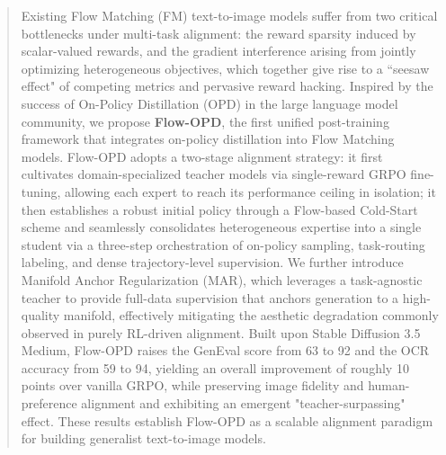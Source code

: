 \begin{abstract}
Existing Flow Matching (FM) text-to-image models suffer from two critical bottlenecks under multi-task alignment: the reward sparsity induced by scalar-valued rewards, and the gradient interference arising from jointly optimizing heterogeneous objectives, which together give rise to a ``seesaw effect" of competing metrics and pervasive reward hacking. Inspired by the success of On-Policy Distillation (OPD) in the large language model community, we propose \textbf{Flow-OPD}, the first unified post-training framework that integrates on-policy distillation into Flow Matching models. Flow-OPD adopts a two-stage alignment strategy: it first cultivates domain-specialized teacher models via single-reward GRPO fine-tuning, allowing each expert to reach its performance ceiling in isolation; it then establishes a robust initial policy through a Flow-based Cold-Start scheme and seamlessly consolidates heterogeneous expertise into a single student via a three-step orchestration of on-policy sampling, task-routing labeling, and dense trajectory-level supervision. We further introduce Manifold Anchor Regularization (MAR), which leverages a task-agnostic teacher to provide full-data supervision that anchors generation to a high-quality manifold, effectively mitigating the aesthetic degradation commonly observed in purely RL-driven alignment. Built upon Stable Diffusion 3.5 Medium, Flow-OPD raises the GenEval score from 63 to 92 and the OCR accuracy from 59 to 94, yielding an overall improvement of roughly 10 points over vanilla GRPO, while preserving image fidelity and human-preference alignment and exhibiting an emergent "teacher-surpassing" effect. These results establish Flow-OPD as a scalable alignment paradigm for building generalist text-to-image models.
\end{abstract}
